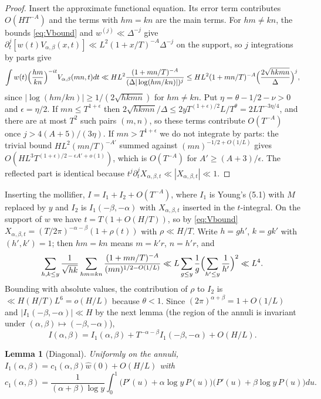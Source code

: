 \documentclass[11pt]{article}
\newtheorem{lemma}[theorem]{Lemma}
\theoremstyle{remark}
\newcommand{\wh}{\widehat w(0)}
\begin{document}
\begin{proof}
Insert the approximate functional equation. Its error term contributes
$O(HT^{-A})$ and the terms with $hm=kn$ are the main terms. For $hm\ne kn$,
the bounds \eqref{eq:Vbound} and $w^{(j)}\ll\Delta^{-j}$ give
$\partial_t^j[w(t)V_{\alpha,\beta}(x,t)]\ll L^2(1+x/T)^{-A}\Delta^{-j}$ on the
support, so $j$ integrations by parts give
\[
 \int w(t)\Bigl(\frac{hm}{kn}\Bigr)^{-it}V_{\alpha,\beta}(mn,t)dt
 \ll HL^2\frac{(1+mn/T)^{-A}}{(\Delta|\log(hm/kn)|)^j}
 \le HL^2(1+mn/T)^{-A}\Bigl(\frac{2\sqrt{hkmn}}{\Delta}\Bigr)^j,
\]
since $|\log(hm/kn)|\ge1/(2\sqrt{hkmn})$ for $hm\ne kn$. Put
$\eta=\theta-1/2-\nu>0$ and $\epsilon=\eta/2$. If $mn\le T^{1+\epsilon}$ then
$2\sqrt{hkmn}/\Delta\le2yT^{(1+\epsilon)/2}L/T^\theta=2LT^{-3\eta/4}$, and there
are at most $T^{2}$ such pairs $(m,n)$, so these terms contribute
$O(T^{-A})$ once $j>4(A+5)/(3\eta)$. If $mn>T^{1+\epsilon}$ we do not integrate
by parts: the trivial bound $HL^2(mn/T)^{-A'}$ summed against
$(mn)^{-1/2+O(1/L)}$ gives $O(HL^3T^{(1+\epsilon)/2-\epsilon A'+o(1)})$, which is
$O(T^{-A})$ for $A'\ge(A+3)/\epsilon$. The reflected part is identical because
$t^j\partial_t^jX_{\alpha,\beta,t}\ll|X_{\alpha,\beta,t}|\ll1$.
\end{proof}

Inserting the mollifier, $I=I_1+I_2+O(T^{-A})$, where $I_1$ is Young's (5.1)
with $M$ replaced by $y$ and $I_2$ is $I_1(-\beta,-\alpha)$ with
$X_{\alpha,\beta,t}$ inserted in the $t$-integral. On the support of $w$ we have
$t=T(1+O(H/T))$, so by \eqref{eq:Vbound}
$X_{\alpha,\beta,t}=(T/2\pi)^{-\alpha-\beta}(1+\rho(t))$ with $\rho\ll H/T$.
Write $h=gh'$, $k=gk'$ with $(h',k')=1$; then $hm=kn$ means $m=k'r$, $n=h'r$,
and
\[
 \sum_{h,k\le y}\frac1{\sqrt{hk}}\sum_{hm=kn}
 \frac{(1+mn/T)^{-A}}{(mn)^{1/2-O(1/L)}}
 \ll L\sum_{g\le y}\frac1g\Bigl(\sum_{h'\le y}\frac1{h'}\Bigr)^2\ll L^4.
\]
Bounding with absolute values, the contribution of $\rho$ to $I_2$ is
$\ll H(H/T)L^6=o(H/L)$ because $\theta<1$. Since $(2\pi)^{\alpha+\beta}=1+O(1/L)$
and $|I_1(-\beta,-\alpha)|\ll H$ by the next lemma (the region of the annuli
is invariant under $(\alpha,\beta)\mapsto(-\beta,-\alpha)$),
\begin{equation}\label{eq:I1I2}
 I(\alpha,\beta)=I_1(\alpha,\beta)+T^{-\alpha-\beta}I_1(-\beta,-\alpha)+O(H/L).
\end{equation}

\begin{lemma}[Diagonal]\label{lem:diagonal}
Uniformly on the annuli, $I_1(\alpha,\beta)=c_1(\alpha,\beta)\wh+O(H/L)$ with
\[
 c_1(\alpha,\beta)=\frac1{(\alpha+\beta)\log y}\int_0^1
 \bigl(P'(u)+\alpha\log y\,P(u)\bigr)\bigl(P'(u)+\beta\log y\,P(u)\bigr)du .
\]
\end{lemma}
\end{document}
